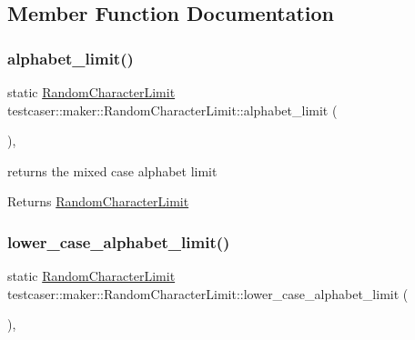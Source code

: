 \subsection{Member Function Documentation}
\mbox{\label{structtestcaser_1_1maker_1_1RandomCharacterLimit_a4519263daf2737941039054c60c26ca5}} 
\subsubsection{\texorpdfstring{alphabet\_limit()}{alphabet\_limit()}}
{\footnotesize\ttfamily static \mbox{\hyperlink{structtestcaser_1_1maker_1_1RandomCharacterLimit}{Random\+Character\+Limit}} testcaser\+::maker\+::\+Random\+Character\+Limit\+::alphabet\+\_\+limit (\begin{DoxyParamCaption}{ }\end{DoxyParamCaption})\hspace{0.3cm}{\ttfamily [inline]}, {\ttfamily [static]}}



returns the mixed case alphabet limit 

\begin{DoxyReturn}{Returns}
\mbox{\hyperlink{structtestcaser_1_1maker_1_1RandomCharacterLimit}{Random\+Character\+Limit}} 
\end{DoxyReturn}
\mbox{\label{structtestcaser_1_1maker_1_1RandomCharacterLimit_ae6e40c00b9225a88b0133c17d4b24f90}} 
\subsubsection{\texorpdfstring{lower\_case\_alphabet\_limit()}{lower\_case\_alphabet\_limit()}}
{\footnotesize\ttfamily static \mbox{\hyperlink{structtestcaser_1_1maker_1_1RandomCharacterLimit}{Random\+Character\+Limit}} testcaser\+::maker\+::\+Random\+Character\+Limit\+::lower\+\_\+case\+\_\+alphabet\+\_\+limit (\begin{DoxyParamCaption}{ }\end{DoxyParamCaption})\hspace{0.3cm}{\ttfamily [inline]}, {\ttfamily [static]}}



